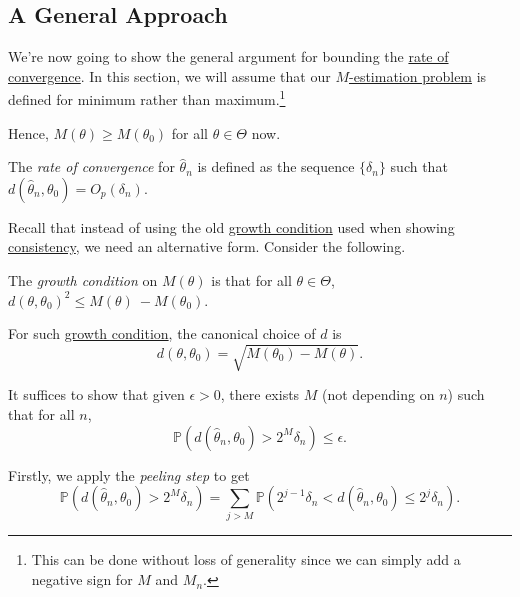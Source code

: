 \subsection{A General Approach}
We're now going to show the general argument for bounding the \hyperref[def:rate-of-convergence]{rate of convergence}. In this section, we will assume that our \hyperref[prb:M-estimation]{\(M\)-estimation problem} is defined for minimum rather than maximum.\footnote{This can be done without loss of generality since we can simply add a negative sign for \(M\) and \(M_n\).}

\begin{note}
	Hence, \(M(\theta ) \geq M(\theta _0)\) for all \(\theta \in \Theta \) now.
\end{note}

\begin{definition}\label{def:rate-of-convergence}
	The \emph{rate of convergence} for \(\hat{\theta} _n\) is defined as the sequence \(\{ \delta _n \} \) such that \(d(\hat{\theta} _n, \theta _0) = O_p(\delta _n)\).
\end{definition}

Recall that instead of using the old \hyperref[def:growth-condition]{growth condition} used when showing \hyperref[def:consistent]{consistency}, we need an alternative form. Consider the following.

\begin{definition}\label{def:growth-condition*}
	The \emph{growth condition} on \(M(\theta )\) is that for all \(\theta \in \Theta \), \(d(\theta , \theta _0)^2 \leq M(\theta )\ - M(\theta _0)\).
\end{definition}

\begin{note}
	For such \hyperref[def:growth-condition*]{growth condition}, the canonical choice of \(d\) is
	\[
		d(\theta , \theta _0) = \sqrt{M(\theta _0) - M(\theta )}.
	\]
\end{note}

It suffices to show that given \(\epsilon > 0\), there exists \(M\) (not depending on \(n\)) such that for all \(n\),
\[
	\mathbb{P} (d(\hat{\theta} _n, \theta _0) > 2^M \delta _n) \leq \epsilon.
\]

Firstly, we apply the \emph{peeling step} to get
\begin{equation}\label{eq:peeling-step}
	\mathbb{P} (d(\hat{\theta} _n, \theta _0) > 2^M \delta _n)
	= \sum_{j > M} \mathbb{P} (2^{j-1} \delta _n < d(\hat{\theta} _n, \theta _0) \leq 2^j \delta _n).
\end{equation}

